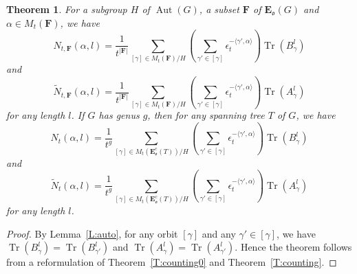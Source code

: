 \documentclass[11pt]{amsart}
\theoremstyle{plain}
\newtheorem{theorem}{Theorem}[section]
\theoremstyle{definition}
\newcommand{\mfrako}{{\mathfrak o}}
\newcommand{\vE}{{\mathbf E}}
\newcommand{\vF}{{\mathbf F}}
\DeclareMathOperator{\trace}{\operatorname{Tr}}
\DeclareMathOperator{\Aut}{\operatorname{Aut}}
\numberwithin{equation}{section}
\begin{document}
\begin{theorem}\label{T:red_counting}
For a subgroup $H$ of $\Aut(G)$, a subset $\vF$ of $\vE_\mfrako(G)$ and $\alpha\in M_t(\vF)$,  we have
$$N_{t,\vF}(\alpha,l) = \frac{1}{t^{|\vF|}}\sum_{[\gamma]\in M_t(\vF)/H}\left(\sum_{\gamma'\in [\gamma]}\epsilon_t^{-\langle\gamma', \alpha\rangle}\right)\trace\left(B_\gamma^l\right)$$
and
$$ \widetilde{N}_{t,\vF}(\alpha,l)= \frac{1}{t^{|\vF|}}\sum_{[\gamma]\in M_t(\vF)/H}\left(\sum_{\gamma'\in [\gamma]}\epsilon_t^{-\langle\gamma', \alpha\rangle}\right)\trace\left(A_{\gamma}^l\right)$$
for any length $l$. If $G$ has genus $g$, then for any spanning tree $T$ of $G$, we have 
$$N_t(\alpha,l) = \frac{1}{t^g}\sum_{[\gamma]\in M_t(\vE_\mfrako^c(T))/H}\left(\sum_{\gamma'\in [\gamma]}\epsilon_t^{-\langle\gamma', \alpha\rangle}\right)\trace\left(B_\gamma^l\right)$$
and
$$ \widetilde{N}_t(\alpha,l)= \frac{1}{t^g}\sum_{[\gamma]\in M_t(\vE_\mfrako^c(T))/H}\left(\sum_{\gamma'\in [\gamma]}\epsilon_t^{-\langle\gamma', \alpha\rangle}\right)\trace\left(A_{\gamma}^l\right)$$
for any length $l$.
\end{theorem}

\begin{proof}
By Lemma~\ref{L:auto}, for any orbit $[\gamma]$ and any $\gamma'\in [\gamma]$, we have $\trace\left(B_\gamma^l\right)=\trace\left(B_{\gamma'}^l\right)$ and  $\trace\left(A_{\gamma}^l\right)=\trace\left(A_{\gamma'}^l\right)$. Hence the theorem follows from a reformulation of Theorem~\ref{T:counting0} and Theorem~\ref{T:counting}. 
\end{proof}
\end{document}
